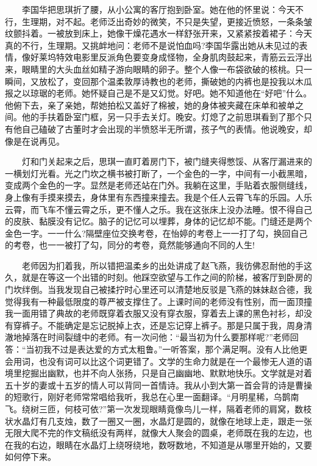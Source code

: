 \documentclass[12pt,UTF8]{ctexbook}
\begin{document}
　　李国华把思琪折了腰，从小公寓的客厅抱到卧室。她在他的怀里说：今天不行，生理期，对不起。老师泛出奇妙的微笑，不只是失望，更接近愤怒，一条条皱纹颤抖着。一被放到床上，她像干燥花遇水一样舒张开来，又紧紧按着裙子：今天真的不行，生理期。又挑衅地问：老师不是说怕血吗?李国华露出她从未见过的表情，像好莱坞特效电影里反派角色要变身成怪物，全身肌肉鼓起来，青筋云云浮出来，眼睛里的大头血丝如精子游向眼睛的卵子。整个人像一布袋欲破的核桃。只一瞬间，又放松了，变回那个温柔敦厚诗教也的老师，撕破她的内裤也是投我以木瓜报之以琼琚的老师。她怀疑自己是不是又幻觉。好吧。她不知道他在\enquote{好吧}什么。他俯下去，亲了亲她，帮她拍松又盖好了棉被，她的身体被夹藏在床单和被单之间。他的手扶着卧室门框，另一只手去关灯。晚安。灯熄了之前思琪看到了那个只有他自己磕破了古董时才会出现的半愤怒半无所谓，孩子气的表情。他说晚安，却像是在说再见。

　　灯和门关起来之后，思琪一直盯着房门下，被门缝夹得憋馁、从客厅漏进来的一横划灯光看。光之门坎之横书被打断了，一个金色的一字，中间有一小截黑暗，变成两个金色的一字。显然是老师还站在门外。我躺在这里，手贴着衣服侧缝线，身上像有手摸来摸去，身体里有东西撞来撞去。我是个任人云霄飞车的乐园。人乐云霄，而飞车不懂云霄之乐，更不懂人之乐。我在这张床上没办法睡。恨不得自己的皮肤、黏膜没有记忆。脑子的记忆可以埋葬，身体的记忆却不能。门缝还是两个金色一字。一一什么?隔壁座位交换考卷，在怡婷的考卷上一一打了勾，换回自己的考卷，也一一被打了勾，同分的考卷，竟然能够通向不同的人生!

　　老师因为扪着我，所以错把温柔乡的出处讲成了赵飞燕，我彷佛忍耐他的手这久，就是在等这一个出错的时刻。他踩空欲望与工作之间的阶梯，被客厅到卧房的门坎绊倒。当我发现自己被揉拧时心里还可以清楚地反驳是飞燕的妹妹赵合德，我觉得我有一种最低限度的尊严被支撑住了。上课时间的老师没有性别，而一面顶撞我一面用错了典故的老师既穿着衣服又没有穿衣服，穿着去上课的黑色衬衫，却没有穿裤子。不能确定是忘记脱掉上衣，还是忘记穿上裤子。那是只属于我，周身清澈地掉落在时间裂缝中的老师。有一次问他：\enquote{最当初为什么要那样呢?}老师回答：\enquote{当初我不过是表达爱的方式太粗鲁。}一听答案，那个满足啊。没有人比他更会用词，也没有词可以比这个词更错了。文学的生命力就是在一个最惨无人道的语境里挖掘出幽默，也并不向人张扬，只是自己幽幽地、默默地快乐。文学就是对着五十岁的妻或十五岁的情人可以背同一首情诗。我从小到大第一首会背的诗是曹操的短歌行，刚好老师常常唱给我听，我总在心里一面翻译。\enquote{月明星稀，乌鹊南飞。绕树三匝，何枝可依?}第一次发现眼睛竟像鸟儿一样，隔着老师的肩窝，数枝状水晶灯有几支烛，数了一圈又一圈，水晶灯是圆的，就像在地球上走，跟走一张无限大爬不完的作文稿纸没有两样，就像大人聚会的圆桌，老师既在我的左边，也在我的右边，眼睛在水晶灯上绕呀绕地，数呀数地，不知道是从哪里开始的，又要如何停下来。
\end{document}
